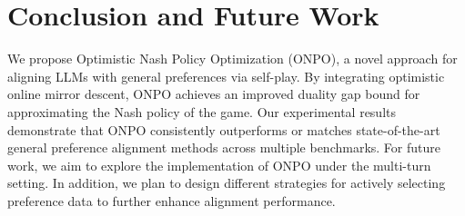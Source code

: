 \section{Conclusion and Future Work}\label{sec:conclusion}
We propose Optimistic Nash Policy Optimization (ONPO), a novel approach for aligning LLMs with general preferences via self-play. By integrating optimistic online mirror descent, ONPO achieves an improved duality gap bound for approximating the Nash policy of the game. Our experimental results demonstrate that ONPO consistently outperforms or matches state-of-the-art general preference alignment methods across multiple benchmarks. For future work, we aim to explore the implementation of ONPO under the multi-turn setting. In addition, we plan to design different strategies for actively selecting preference data to further enhance alignment performance.